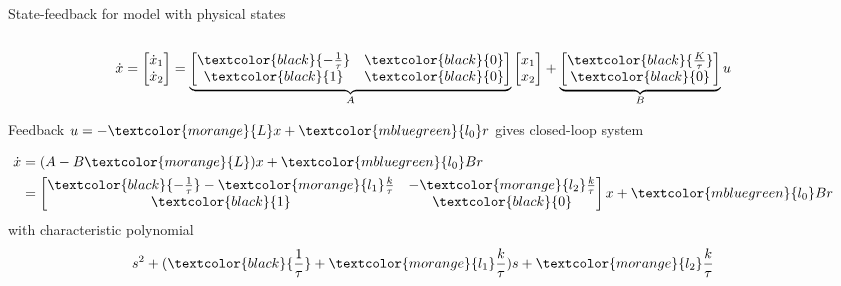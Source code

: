 \documentclass[presentation,aspectratio=169]{beamer}
\begin{document}
\begin{frame}[label={sec:org76cc716}]{State-feedback for model with physical states}
\begin{columns}
\begin{column}{0.4\columnwidth}
\[ \dot{x} = \begin{bmatrix} \dot{x}_1\\\dot{x}_2\end{bmatrix} = \underbrace{\begin{bmatrix} \textcolor{black}{-\frac{1}{\tau}} & \textcolor{black}{0} \\\textcolor{black}{1} & \textcolor{black}{0} \end{bmatrix}}_{A} \begin{bmatrix} x_1\\x_2\end{bmatrix} + \underbrace{\begin{bmatrix} \textcolor{black}{\frac{K}{\tau}} \\ \textcolor{black}{0} \end{bmatrix}}_{B} u \]

Feedback \(u = -\textcolor{morange}{L}x + \textcolor{mbluegreen}{l_0} r\) gives closed-loop system

\begin{align*}
  \dot{x} &= (A-B\textcolor{morange}{L})x + \textcolor{mbluegreen}{l_0}Br\\
  &= \begin{bmatrix} \textcolor{black}{-\frac{1}{\tau}} -\textcolor{morange}{l_1}\frac{k}{\tau} & - \textcolor{morange}{l_2}\frac{k}{\tau} \\\textcolor{black}{1} & \textcolor{black}{0} \end{bmatrix} x + \textcolor{mbluegreen}{l_0} B r
  \end{align*}
with characteristic polynomial
\[s^2 + (\textcolor{black}{\frac{1}{\tau}}  + \textcolor{morange}{l_1}\frac{k}{\tau})s +  \textcolor{morange}{l_2}\frac{k}{\tau} \]
\end{column}


\begin{column}{0.4\columnwidth}
\begin{center}
\end{center}
\end{column}
\end{columns}
\end{frame}
\end{document}
